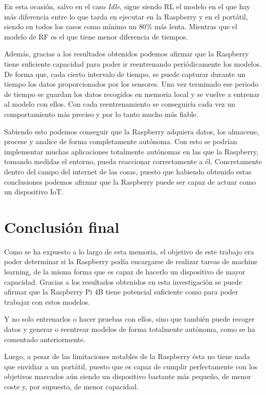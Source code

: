 \documentclass[a4paper, 12pt]{book}
\begin{document}
En esta ocasión, salvo en el caso \textit{Idle}, sigue siendo RL el modelo en el que hay más diferencia entre lo que tarda en ejecutar en la Raspberry y en el portátil, siendo en todos los casos como mínimo un $80\%$ más lenta. Mientras que el modelo de RF es el que tiene menor diferencia de tiempos.

Además, gracias a los resultados obtenidos podemos afirmar que la Raspberry tiene suficiente capacidad para poder ir reentrenando periódicamente los modelos. De forma que, cada cierto intervalo de tiempo, se puede capturar durante un tiempo los datos proporcionados por los sensores. Una vez terminado ese periodo de tiempo se guardan los datos recogidos en memoria local y se vuelve a entrenar al modelo con ellos. Con cada reentrenamiento se conseguiría cada vez un comportamiento más preciso y por lo tanto mucho más fiable.

Sabiendo esto podemos conseguir que la Raspberry adquiera datos, los almacene, procese y analice de forma completamente autónoma. Con esto se podrían implementar muchas aplicaciones totalmente autónomas en las que la Raspberry, tomando medidas el entorno, pueda reaccionar correctamente a él. Concretamente dentro del campo del internet de las cosas, puesto que habiendo obtenido estas conclusiones podemos afirmar que la Raspberry puede ser capaz de actuar como un dispositivo IoT.


\section{Conclusión final}
\label{sec:conclusion_final}

Como se ha expuesto a lo largo de esta memoria, el objetivo de este trabajo era poder determinar si la Raspberry podía encargarse de realizar tareas de machine learning, de la misma forma que es capaz de hacerlo un dispositivo de mayor capacidad. Gracias a los resultados obtenidos en esta investigación se puede afirmar que la Raspberry Pi 4B tiene potencial suficiente como para poder trabajar con estos modelos.

Y no solo entrenarlos o hacer pruebas con ellos, sino que también puede recoger datos y generar o reentrear modelos de forma totalmente autónoma, como se ha comentado anteriormente. 

Luego, a pesar de las limitaciones notables de la Raspberry ésta no tiene nada que envidiar a un portátil, puesto que es capaz de cumplir perfectamente con los objetivos marcados aún siendo un dispositivo bastante más pequeño, de menor coste y, por supuesto, de menor capacidad.
\end{document}
